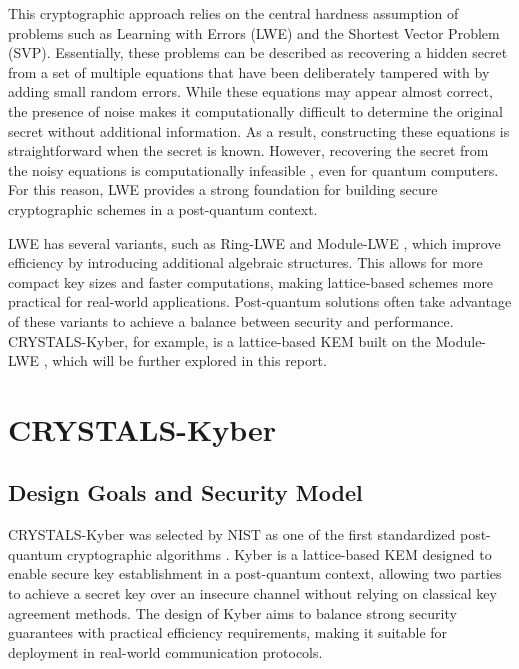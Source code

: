 \documentclass[12pt]{article}
\begin{document}
This cryptographic approach relies on the central hardness assumption of problems such as Learning with Errors (LWE) and the Shortest Vector Problem (SVP)\cite{regev2005}. Essentially, these problems can be described as recovering a hidden secret from a set of multiple equations that have been deliberately tampered with by adding small random errors. While these equations may appear almost correct, the presence of noise makes it computationally difficult to determine the original secret without additional information. As a result, constructing these equations is straightforward when the secret is known. However, recovering the secret from the noisy equations is computationally infeasible \cite{regev2005}, even for quantum computers. For this reason, LWE provides a strong foundation for building secure cryptographic schemes in a post-quantum context.

LWE has several variants, such as Ring-LWE and Module-LWE \cite{regev2005}, which improve efficiency by introducing additional algebraic structures. This allows for more compact key sizes and faster computations, making lattice-based schemes more practical for real-world applications. Post-quantum solutions often take advantage of these variants to achieve a balance between security and performance. CRYSTALS-Kyber, for example, is a lattice-based KEM built on the Module-LWE \cite{kyberspec}, which will be further explored in this report.




\newpage
\section{CRYSTALS-Kyber}



\subsection {Design Goals and Security Model}

CRYSTALS-Kyber was selected by NIST as one of the first standardized post-quantum cryptographic algorithms \cite{nist2024,kyberspec}. Kyber is a lattice-based KEM designed to enable secure key establishment in a post-quantum context, allowing two parties to achieve a secret key over an insecure channel without relying on classical key agreement methods. The design of Kyber aims to balance strong security guarantees with practical efficiency requirements, making it suitable for deployment in real-world communication protocols.
\end{document}
